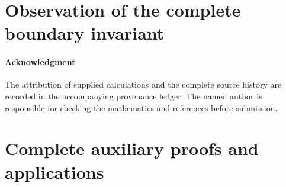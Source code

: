 \part{Observation of the complete boundary invariant}



\subsection*{Acknowledgment}
The attribution of supplied calculations and the complete source history
are recorded in the accompanying provenance ledger. The named author is
responsible for checking the mathematics and references before submission.

\appendix
\renewcommand{\thesection}{A.\arabic{section}}
\renewcommand{\theHsection}{appendix.\arabic{section}}
\part{Complete auxiliary proofs and applications}





































